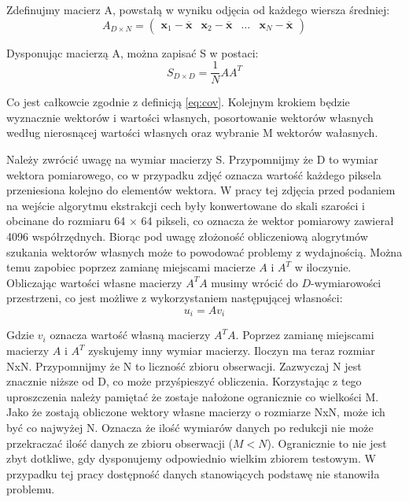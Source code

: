 \documentclass{article}
\newcommand{\bb}{\textbf}
\begin{document}
Zdefinujmy macierz A, powstałą w wyniku odjęcia od każdego wiersza średniej:
\begin{equation}
	A_{D \times N} = 
	\left( \begin{array}{llll}
	\bb{x}_1 - \overline{\bb{x}} & \bb{x}_2 - \overline{\bb{x}} & \ldots & \bb{x}_N - \overline{\bb{x}}
	\end{array} \right)
\end{equation}


Dysponując macierzą A, można zapisać S w postaci:
\begin{equation}
	S_{D \times D} = \frac{1}{N} A A^T
\end{equation}

Co jest całkowcie zgodnie z definicją \ref{eq:cov}. Kolejnym krokiem będzie wyznacznie wektorów i wartości własnych, posortowanie wektorów własnych według nierosnącej wartości własnych oraz wybranie M wektorów wałasnych. 

Należy zwrócić uwagę na wymiar macierzy S. Przypomnijmy że D to wymiar wektora pomiarowego, co w przypadku zdjęć oznacza wartość każdego piksela przeniesiona kolejno do elementów wektora. W pracy tej zdjęcia przed podaniem na wejście algorytmu ekstrakcji cech były konwertowane do skali szarości i obcinane do rozmiaru 64 $\times$ 64 pikseli, co oznacza że wektor pomiarowy zawierał 4096 współrzędnych. Biorąc pod uwagę złożoność obliczeniową alogrytmów szukania wektorów własnych może to powodować problemy z wydajnością. Można temu zapobiec poprzez zamianę miejscami macierze $A$ i $A^T$ w iloczynie. Obliczając wartości własne macierzy $A^T A$ musimy wrócić do $D$-wymiarowości przestrzeni, co jest możliwe z wykorzystaniem następującej własności:
\begin{equation}
	u_i = A v_i
\end{equation}

Gdzie $v_i$ oznacza wartość własną macierzy $A^T A$. Poprzez zamianę miejscami macierzy $A$ i $A^T$ zyskujemy inny wymiar macierzy. Iloczyn ma teraz rozmiar NxN. Przypomnijmy że N to liczność zbioru obserwacji. Zazwyczaj N jest znacznie niższe od D, co może przyśpieszyć obliczenia. Korzystając z tego uproszczenia należy pamiętać że zostaje nałożone ogranicznie co wielkości M. Jako że zostają obliczone wektory własne macierzy o rozmiarze NxN, może ich być co najwyżej N. Oznacza że ilość wymiarów danych po redukcji nie może przekraczać ilość danych ze zbioru obserwacji ($M < N$). Ogranicznie to nie jest zbyt dotkliwe, gdy dysponujemy odpowiednio wielkim zbiorem testowym. W przypadku tej pracy dostępność danych stanowiących podstawę nie stanowiła problemu.
\end{document}
